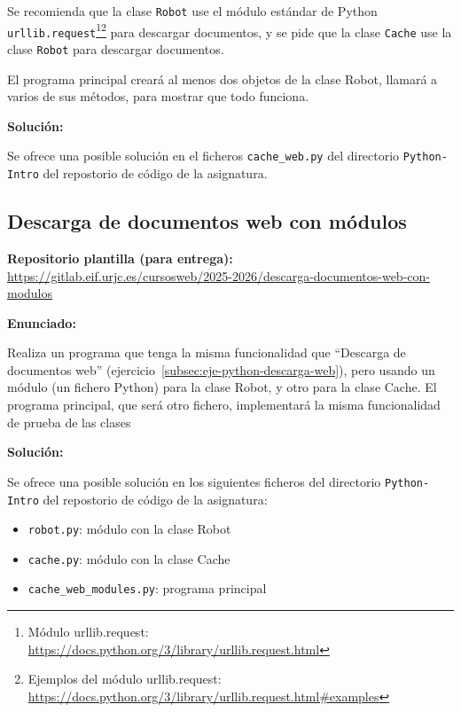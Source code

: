 Se recomienda que la clase \verb|Robot| use el módulo estándar de Python \verb|urllib.request|\footnote{Módulo urllib.request: \\ \url{https://docs.python.org/3/library/urllib.request.html}}\footnote{Ejemplos del módulo urllib.request: \\ \url{https://docs.python.org/3/library/urllib.request.html\#examples}} para descargar documentos, y se pide que la clase \verb|Cache| use la clase \verb|Robot| para descargar documentos.

El programa principal creará al menos dos objetos de la clase Robot, llamará a varios de sus métodos, para mostrar que todo funciona.

\textbf{Solución:}

Se ofrece una posible solución en el ficheros \verb|cache_web.py| del directorio \verb|Python-Intro| del repostorio de código de la asignatura.


\subsection{Descarga de documentos web con módulos}
\label{subsec:eje-python-descarga-web-modulos}

\textbf{Repositorio plantilla (para entrega):} \\
\url{https://gitlab.eif.urjc.es/cursosweb/2025-2026/descarga-documentos-web-con-modulos}

\textbf{Enunciado:}

Realiza un programa que tenga la misma funcionalidad que ``Descarga de documentos web'' (ejercicio~\ref{subsec:eje-python-descarga-web}), pero usando un módulo (un fichero Python) para la clase Robot, y otro para la clase Cache. El programa principal, que será otro fichero, implementará la misma funcionalidad de prueba de las clases

\textbf{Solución:}

Se ofrece una posible solución en los siguientes ficheros del directorio \verb|Python-Intro| del repostorio de código de la asignatura:

\begin{itemize}
\item \verb|robot.py|: módulo con la clase Robot
\item \verb|cache.py|: módulo con la clase Cache
\item \verb|cache_web_modules.py|: programa principal
\end{itemize}


